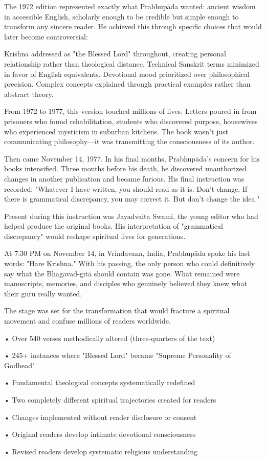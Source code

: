 \documentclass[11pt,twoside]{book}
\begin{document}
The 1972 edition represented exactly what Prabhupāda wanted: ancient wisdom in accessible English, scholarly enough to be credible but simple enough to transform any sincere reader. He achieved this through specific choices that would later become controversial:

Krishna addressed as "the Blessed Lord" throughout, creating personal relationship rather than theological distance. Technical Sanskrit terms minimized in favor of English equivalents. Devotional mood prioritized over philosophical precision. Complex concepts explained through practical examples rather than abstract theory.

From 1972 to 1977, this version touched millions of lives. Letters poured in from prisoners who found rehabilitation, students who discovered purpose, housewives who experienced mysticism in suburban kitchens. The book wasn't just communicating philosophy—it was transmitting the consciousness of its author.

Then came November 14, 1977. In his final months, Prabhupāda's concern for his books intensified. Three months before his death, he discovered unauthorized changes in another publication and became furious. His final instruction was recorded: "Whatever I have written, you should read as it is. Don't change. If there is grammatical discrepancy, you may correct it. But don't change the idea."

Present during this instruction was Jayadvaita Swami, the young editor who had helped produce the original books. His interpretation of "grammatical discrepancy" would reshape spiritual lives for generations.

At 7:30 PM on November 14, in Vrindavana, India, Prabhupāda spoke his last words: "Hare Krishna." With his passing, the only person who could definitively say what the Bhagavad-gītā should contain was gone. What remained were manuscripts, memories, and disciples who genuinely believed they knew what their guru really wanted.

The stage was set for the transformation that would fracture a spiritual movement and confuse millions of readers worldwide.

\begin{chapterfindingsbox}
• Over 540 verses methodically altered (three-quarters of the text)

• 245+ instances where "Blessed Lord" became "Supreme Personality of Godhead"

• Fundamental theological concepts systematically redefined

• Two completely different spiritual trajectories created for readers

• Changes implemented without reader disclosure or consent

• Original readers develop intimate devotional consciousness

• Revised readers develop systematic religious understanding
\end{chapterfindingsbox}
\end{document}
